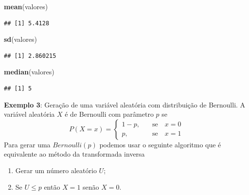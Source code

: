 \documentclass[
]{book}
\newenvironment{Shaded}{\begin{snugshade}}{\end{snugshade}}
\newcommand{\FunctionTok}[1]{\textcolor[rgb]{0.13,0.29,0.53}{\textbf{#1}}}
\newcommand{\NormalTok}[1]{#1}
\providecommand{\tightlist}{%
  \setlength{\itemsep}{0pt}\setlength{\parskip}{0pt}}
\begin{document}
\begin{Shaded}
\begin{Highlighting}[]
\FunctionTok{mean}\NormalTok{(valores)}
\end{Highlighting}
\end{Shaded}

\begin{verbatim}
## [1] 5.4128
\end{verbatim}

\begin{Shaded}
\begin{Highlighting}[]
\FunctionTok{sd}\NormalTok{(valores)}
\end{Highlighting}
\end{Shaded}

\begin{verbatim}
## [1] 2.860215
\end{verbatim}

\begin{Shaded}
\begin{Highlighting}[]
\FunctionTok{median}\NormalTok{(valores)}
\end{Highlighting}
\end{Shaded}

\begin{verbatim}
## [1] 5
\end{verbatim}

\textbf{Exemplo 3}: Geração de uma variável aleatória com distribuição de
Bernoulli. A variável aleatória \(X\) é de Bernoulli com parâmetro \(p\) se
\[P(X = x) = \begin{cases} 1-p,& \quad \text{se} \quad x=0\\
p,& \quad \text{se} \quad x=1 \end{cases}\] Para gerar uma
\(Bernoulli(p)\) podemos usar o seguinte algoritmo que é equivalente ao
método da transformada inversa

\begin{enumerate}
\def\labelenumi{\arabic{enumi}.}
\tightlist
\item
  Gerar um número aleatório \(U\);
\item
  Se \(U \leq p\) então \(X=1\) senão \(X=0\).
\end{enumerate}
\end{document}
